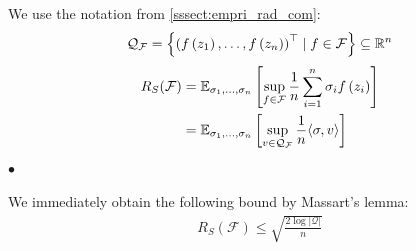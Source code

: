 \documentclass{article}
\begin{document}
We use the notation from \cref{sssect:empri_rad_com}:
\begin{align*}
\mathcal{Q}_{\mathcal{F}}=\left\{\left(f\left(z_{1}\right), \ldots, f\left(z_{n}\right)\right)^\top \mid f \in \mathcal{F}\right\}\subseteq \mathbb{R}^n
\end{align*}
\begin{align*}
\begin{aligned}
R_{S}(\mathcal{F}) &=\mathbb{E}_{\sigma_{1}, \ldots, \sigma_{n}}\left[\sup _{f \in \mathcal{F}} \frac{1}{n} \sum_{i=1}^{n} \sigma_{i} f\left(z_{i}\right)\right] \\
&=\mathbb{E}_{\sigma_{1}, \ldots, \sigma_{n}}\left[\sup _{v \in \mathcal{Q}_{\mathcal{F}}} \frac{1}{n}\langle\sigma, v\rangle\right]
\end{aligned}
\end{align*}
$\bullet$ 

We immediately obtain the following bound by Massart's lemma:
\begin{align*}
R_{S}(\mathcal{F}) \leq \sqrt{\frac{2 \log |\mathcal{Q}|}{n}}
\end{align*}
\end{document}
